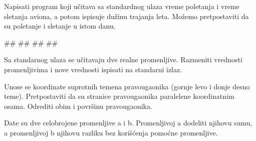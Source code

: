 \begin{Exercise}[label=p1_11] 
Napisati program koji učitava sa standardnog ulaza vreme poletanja i vreme sletanja aviona, a potom ispisuje dužinu trajanja leta. Možemo pretpostaviti da su poletanje i sletanje u istom danu.\\
\begin{miditest}
\begin{upotreba}{1}
#\naslovInt#
##
##
##
\end{upotreba}
\end{miditest}
\end{Exercise}
\begin{Answer}[ref=p1_11]
\end{Answer}

\begin{Exercise}[label=p1_12]
Sa standarnog ulaza se učitavaju dve realne promenljive. Razmeniti vrednosti
promenljivima i nove vrednosti ispisati na standarni izlaz. \\
\end{Exercise}
\begin{Answer}[ref=p1_12]
\end{Answer}


\begin{Exercise}[label=p1_13] 
Unose se koordinate suprotnih temena pravougaonika (gornje levo i
donje desno teme).  Pretpostaviti da su stranice pravougaonika
paralelene koordinatnim osama.  Odrediti obim i površinu
pravougaonika.\\
\end{Exercise}
\begin{Answer}[ref=p1_13]
\end{Answer}


\begin{Exercise}[label=p1_14]
Date su dve celobrojene promenljive a i b. Promenljivoj a dodeliti
njihovu sumu, a promenljivoj b njihovu razliku bez korišćenja pomoćne
promenljive. \\
\end{Exercise}
\begin{Answer}[ref=p1_14]
\end{Answer}

